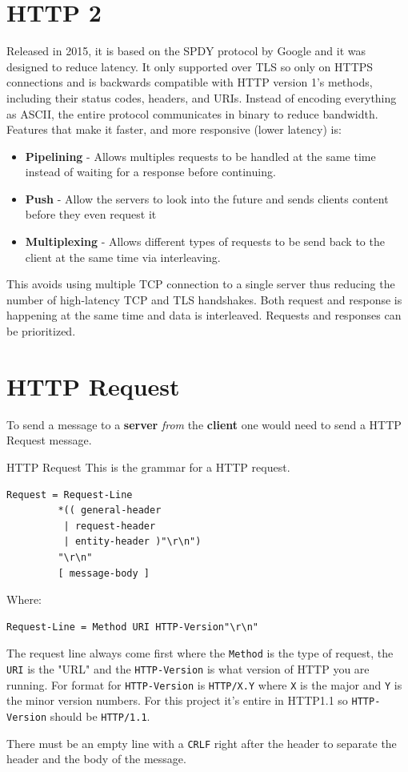 \documentclass[../CMPUT-404-Notes.tex]{subfiles}
\begin{document}
\section{HTTP 2}
Released in 2015, it is based on the SPDY protocol by Google and it was designed to reduce latency. 
It only supported over TLS so only on HTTPS connections and is backwards compatible with HTTP version 1's methods, including their status codes, headers, and URIs.
Instead of encoding everything as ASCII, the entire protocol communicates in binary to reduce bandwidth. 
Features that make it faster, and more responsive (lower latency) is:
\begin{itemize}
  \item \textbf{Pipelining} - Allows multiples requests to be handled at the same time instead of waiting for a response before continuing. 
  \item \textbf{Push} - Allow the servers to look into the future and sends clients content before they even request it 
  \item \textbf{Multiplexing} - Allows different types of requests to be send back to the client at the same time via interleaving.
\end{itemize}

This avoids using multiple TCP connection to a single server thus reducing the number of high-latency TCP and TLS handshakes.
Both request and response is happening at the same time and data is interleaved. Requests and responses can be prioritized.

\newpage
\section{HTTP Request}
To send a message to a \textbf{server} \emph{from} the \textbf{client} one would need to send a HTTP Request message.

\begin{Definition}{HTTP Request}
This is the grammar for a HTTP request.
\begin{verbatim}
Request = Request-Line              
         *(( general-header        
          | request-header         
          | entity-header )"\r\n")  
         "\r\n"
         [ message-body ]          
\end{verbatim}
Where: 
\begin{verbatim}
Request-Line = Method URI HTTP-Version"\r\n"  
\end{verbatim}
The request line always come first where the \texttt{Method} is the type of request, the \texttt{URI} is the "URL" and the \texttt{HTTP-Version} is what version of HTTP you are running.
For format for \texttt{HTTP-Version} is \texttt{HTTP/X.Y} where \texttt{X} is the major and \texttt{Y} is the minor version numbers.
For this project it's entire in HTTP1.1 so \texttt{HTTP-Version} should be \texttt{HTTP/1.1}.

There must be an empty line with a \texttt{CRLF} right after the header to separate the header and the body of the message.
\end{Definition}
\end{document}
